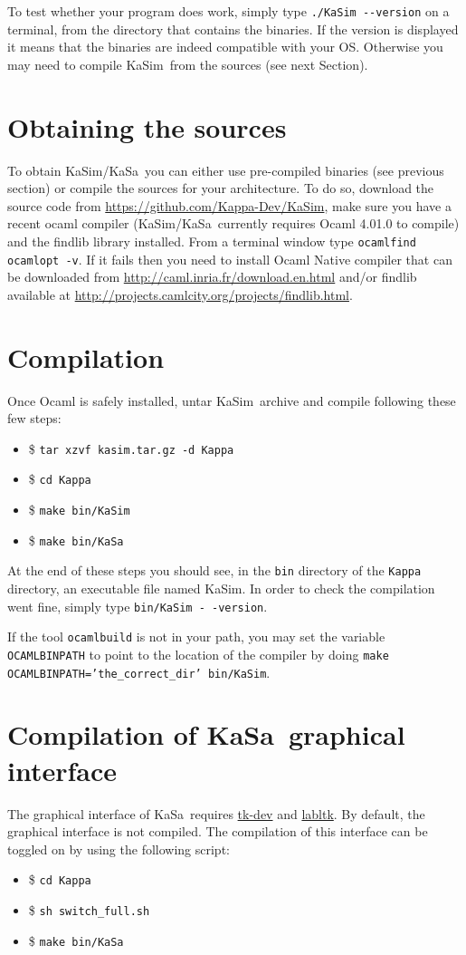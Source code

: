 \documentclass[11pt]{book}
\def\KaSim{\textsf{KaSim}}
\def\KaSa{\textsf{KaSa}}
\def\ttt#1{\texttt{#1}}
\def\ITE#1{\begin{itemize}#1\end{itemize}}
\def\dd{-\hspace{0.001cm}-}
\begin{document}
To test whether your program does work, simply type \ttt{./KaSim \dd version} on a terminal, from the directory that contains the binaries. If the version is displayed it means that the binaries are indeed compatible with your OS. Otherwise you may need to compile \KaSim~from the sources (see next Section).

\section{Obtaining the sources}\label{sec:sources}
To obtain \KaSim/\KaSa~you can either use pre-compiled binaries (see previous section)
or compile the sources for your architecture. To do so, download the source code
from \url{https://github.com/Kappa-Dev/KaSim}, make sure you have a recent ocaml
compiler (\KaSim/\KaSa~currently requires Ocaml 4.01.0 to compile) and the findlib library
installed. From a terminal window type \ttt{ocamlfind ocamlopt -v}. If it fails
then you need to install Ocaml Native compiler that can be downloaded from
\url{http://caml.inria.fr/download.en.html} and/or findlib available at
\url{http://projects.camlcity.org/projects/findlib.html}.

\section{Compilation}
Once Ocaml is safely installed, untar \KaSim~archive and compile following these
few steps: \ITE{
\item[\$]\ttt{tar xzvf kasim.tar.gz -d Kappa}
\item[\$]\ttt{cd Kappa}
\item[\$]\ttt{make bin/KaSim} 
\item[\$]\ttt{make bin/KaSa}} At the end of these steps you should see, in the
\ttt{bin} directory of the \ttt{Kappa} directory, an executable file named
KaSim.  In order to check the compilation went fine, simply type
\ttt{bin/KaSim -\,-version}.

If the tool \ttt{ocamlbuild} is not in your path, you may
set the variable \ttt{OCAMLBINPATH} to point to the location of the
compiler by doing \ttt{make OCAMLBINPATH='the\_correct\_dir' bin/KaSim}.

\section{Compilation of KaSa~graphical interface}

The graphical interface of \KaSa~requires \href{http://www.tcl.tk/}{tk-dev} and 
\href{https://forge.ocamlcore.org/projects/labltk/}{labltk}. By default, the graphical interface is not compiled. The compilation of this interface can be toggled on by using the following script: \ITE{
\item[\$]\ttt{cd Kappa}
\item[\$]\ttt{sh switch\_full.sh}
\item[\$]\ttt{make bin/KaSa}}
\end{document}
